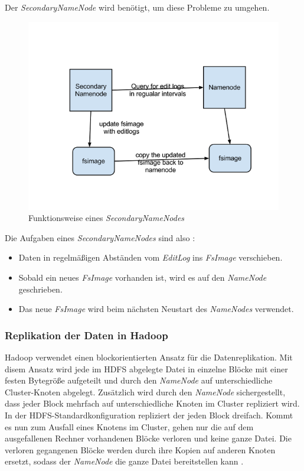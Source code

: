Der \textit{SecondaryNameNode} wird benötigt, um diese Probleme zu umgehen.\\
\begin{figure}[htbp]
	\centering
	\includegraphics[width=1.0\textwidth]{images/06secondarynamenode.png}
	\caption{Funktionsweise eines \textit{SecondaryNameNodes}}
	\label{img:grafik-SecondaryNameNode}
\end{figure}

Die Aufgaben eines \textit{SecondaryNameNodes} sind also  \cite{secNameNode}:
\begin{itemize}
\item Daten in regelmäßigen Abständen vom \textit{EditLog} ins \textit{FsImage} verschieben.
\item Sobald ein neues \textit{FsImage}  vorhanden ist, wird es auf den \textit{NameNode} geschrieben.
\item Das neue \textit{FsImage}  wird beim nächsten Neustart des \textit{NameNodes} verwendet.
\end{itemize}

\subsubsection{Replikation der Daten in Hadoop}
Hadoop verwendet einen blockorientierten Ansatz für die Datenreplikation. Mit disem Ansatz wird jede im \ac{HDFS} abgelegte Datei in einzelne Blöcke mit einer festen Bytegröße aufgeteilt und durch den \textit{NameNode} auf unterschiedliche Cluster-Knoten abgelegt. Zusätzlich wird durch den \textit{NameNode} sichergestellt, dass jeder Block mehrfach auf unterschiedliche Knoten im Cluster repliziert wird.
In der HDFS-Standardkonfiguration repliziert der \cite{replikation} jeden Block dreifach. Kommt es nun zum Ausfall eines Knotens im Cluster, gehen nur die auf dem ausgefallenen Rechner vorhandenen Blöcke verloren und keine ganze Datei. Die verloren gegangenen Blöcke werden durch ihre Kopien auf anderen Knoten ersetzt, sodass der \textit{NameNode} die ganze Datei bereitstellen kann \cite{replikation}.


